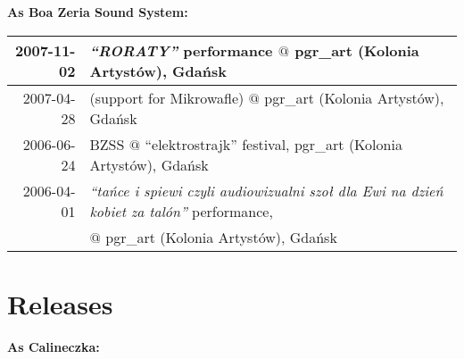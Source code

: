 \documentclass[a4paper]{article}
\begin{document}
\vspace{11mm}

\textbf{As Boa Zeria Sound System:}

\vspace{2mm}

\begin{tabularx}{\textwidth}{r l}
\hline
2007-11-02 & \emph{``RORATY''} performance $@$ pgr\_art (Kolonia Artystów), Gdańsk\\
\hline
2007-04-28 & (support for Mikrowafle) $@$  pgr\_art (Kolonia Artystów), Gdańsk\\
\hline
2006-06-24 & BZSS $@$ ``elektrostrajk'' festival, pgr\_art (Kolonia Artystów), Gdańsk\\
\hline
2006-04-01 & \emph{``tańce i spiewi czyli audiowizualni szoł dla Ewi na dzień kobiet za talón''} performance,\\
           & $@$ pgr\_art (Kolonia Artystów), Gdańsk\\
\end{tabularx}


\newpage

\section*{Releases}

\textbf{As Calineczka:}

\vspace{2mm}
\end{document}
